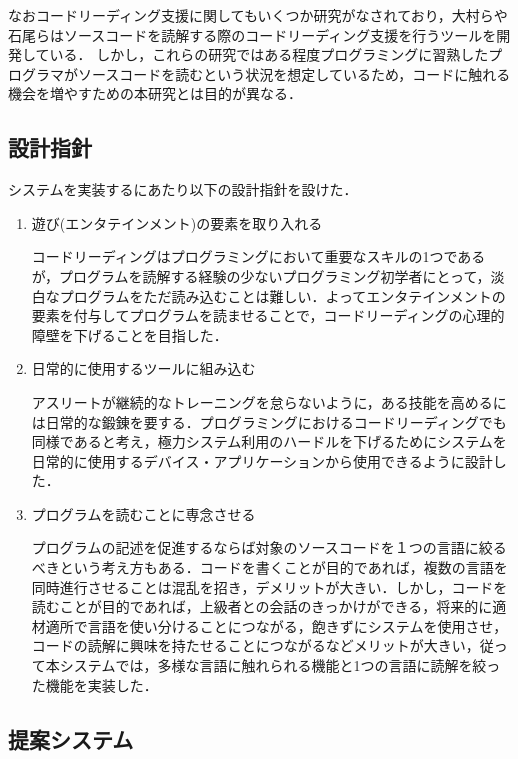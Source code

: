 なおコードリーディング支援に関してもいくつか研究がなされており，大村らや石尾らはソースコードを読解する際のコードリーディング支援を行うツールを開発している\cite{omura}\cite{ishio}．
しかし，これらの研究ではある程度プログラミングに習熟したプログラマがソースコードを読むという状況を想定しているため，コードに触れる機会を増やすための本研究とは目的が異なる．

\subsection{設計指針}
システムを実装するにあたり以下の設計指針を設けた．
\begin{enumerate}
  \item 遊び(エンタテインメント)の要素を取り入れる

  コードリーディングはプログラミングにおいて重要なスキルの1つであるが，プログラムを読解する経験の少ないプログラミング初学者にとって，淡白なプログラムをただ読み込むことは難しい．よってエンタテインメントの要素を付与してプログラムを読ませることで，コードリーディングの心理的障壁を下げることを目指した．
  \item 日常的に使用するツールに組み込む

  アスリートが継続的なトレーニングを怠らないように，ある技能を高めるには日常的な鍛錬を要する．プログラミングにおけるコードリーディングでも同様であると考え，極力システム利用のハードルを下げるためにシステムを日常的に使用するデバイス・アプリケーションから使用できるように設計した．
  \item プログラムを読むことに専念させる

  プログラムの記述を促進するならば対象のソースコードを１つの言語に絞るべきという考え方もある．コードを書くことが目的であれば，複数の言語を同時進行させることは混乱を招き，デメリットが大きい．しかし，コードを読むことが目的であれば，上級者との会話のきっかけができる，将来的に適材適所で言語を使い分けることにつながる，飽きずにシステムを使用させ，コードの読解に興味を持たせることにつながるなどメリットが大きい，従って本システムでは，多様な言語に触れられる機能と1つの言語に読解を絞った機能を実装した．
\end{enumerate}

\subsection{提案システム}
